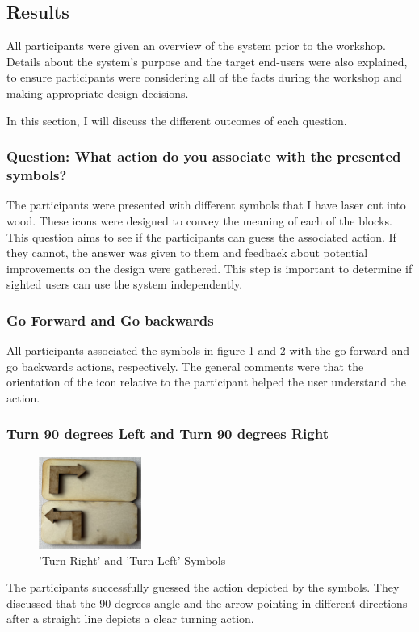 \documentclass[oneside,%
                    author={Malak Hajji},
                    degree={BSc},
                    title={Designing An Accessible Ozobot Programming Platform for Students},
                  subtitle={With Mixed Visual Abilities}]{dissertation}
\begin{document}
\subsection{Results}
All participants were given an overview of the system prior to the workshop. Details about the system's purpose and the target end-users were also explained, to ensure participants were considering all of the facts during the workshop and making appropriate design decisions.

In this section, I will discuss the different outcomes of each question.

\subsubsection{Question: What action do you associate with the presented symbols?}
The participants were presented with different symbols that I have laser cut into wood. These icons were designed to convey the meaning of each of the blocks. This question aims to see if the participants can guess the associated action. If they cannot, the answer was given to them and feedback about potential improvements on the design were gathered. This step is important to determine if sighted users can use the system independently.
\subsubsection{Go Forward and Go backwards}
All participants associated the symbols in figure 1 and 2 with the go forward and go backwards actions, respectively. The general comments were that the orientation of the icon relative to the participant helped the user understand the action. 

\subsubsection{Turn 90 degrees Left and Turn 90 degrees Right}
\FloatBarrier
\begin{figure}[h]
    \centering
    \includegraphics[width=0.3\textwidth]{thesis/turns.eps}
    \caption{'Turn Right' and 'Turn Left' Symbols}
    \label{fig-turn}
\end{figure}
\FloatBarrier
The participants successfully guessed the action depicted by the symbols. They discussed that the 90 degrees angle and the arrow pointing in different directions after a straight line depicts a clear turning action. 
\end{document}
